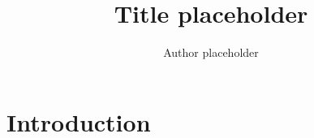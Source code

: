 \documentclass[11pt]{article}
\title{Title placeholder}
\author{Author placeholder}
\begin{document}
\maketitle

\begin{abstract}
\end{abstract}

\section{Introduction}
\lipsum[1-3]
\end{document}
